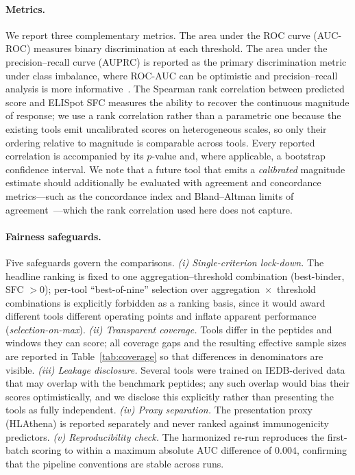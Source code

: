 \paragraph{Metrics.} We report three complementary metrics. The area under the
ROC curve (AUC-ROC) measures binary discrimination at each threshold. The area
under the precision--recall curve (AUPRC) is reported as the primary
discrimination metric under class imbalance, where ROC-AUC can be optimistic and
precision--recall analysis is more informative~\cite{Saito2015}. The Spearman
rank correlation between predicted score and ELISpot SFC measures the ability to
recover the continuous magnitude of response; we use a rank correlation rather
than a parametric one because the existing tools emit uncalibrated scores on
heterogeneous scales, so only their ordering relative to magnitude is comparable
across tools. Every reported correlation is accompanied by its $p$-value and,
where applicable, a bootstrap confidence interval. We note that a future tool that
emits a \emph{calibrated} magnitude estimate should additionally be evaluated with
agreement and concordance metrics---such as the concordance index and
Bland--Altman limits of agreement~\cite{Harrell1996,BlandAltman1986}---which the
rank correlation used here does not capture.

\paragraph{Fairness safeguards.}\label{sec:fairness} Five safeguards govern the comparisons.
\emph{(i) Single-criterion lock-down.} The headline ranking is fixed to one
aggregation--threshold combination (best-binder, SFC $>0$); per-tool
``best-of-nine'' selection over aggregation~$\times$~threshold combinations is
explicitly forbidden as a ranking basis, since it would award different tools
different operating points and inflate apparent performance
(\emph{selection-on-max}). \emph{(ii) Transparent coverage.} Tools differ in the
peptides and windows they can score; all coverage gaps and the resulting
effective sample sizes are reported in Table~\ref{tab:coverage} so that
differences in denominators are visible. \emph{(iii) Leakage disclosure.}
Several tools were trained on IEDB-derived data that may overlap with the
benchmark peptides; any such overlap would bias their scores optimistically, and
we disclose this explicitly rather than presenting the tools as fully
independent. \emph{(iv) Proxy separation.} The presentation proxy (HLAthena) is
reported separately and never ranked against immunogenicity predictors.
\emph{(v) Reproducibility check.} The harmonized re-run reproduces the
first-batch scoring to within a maximum absolute AUC difference of $0.004$,
confirming that the pipeline conventions are stable across runs.

